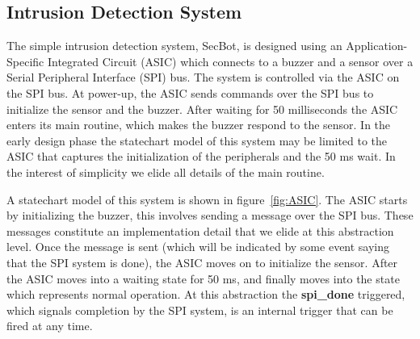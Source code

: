 

\subsection{Intrusion Detection System}
\label{sec:secbot}


The simple intrusion detection system, SecBot, is designed using an Application-Specific Integrated Circuit (ASIC) which connects to a buzzer and a sensor over a Serial Peripheral Interface (SPI) bus. The system is controlled via the ASIC on the SPI bus. At power-up, the ASIC sends commands over the SPI bus to initialize the sensor and the buzzer. After waiting for 50 milliseconds the ASIC enters its main routine, which makes the buzzer respond to the sensor. In the early design phase the statechart model of this system may be limited to the ASIC that captures the initialization of the peripherals and the 50 ms wait. In the interest of simplicity we elide all details of the main routine.

A statechart model of this system is shown in figure~\ref{fig:ASIC}. The ASIC starts by initializing the buzzer, this involves sending a message over the SPI bus. These messages constitute an implementation detail that we elide at this abstraction level. Once the message is sent (which will be indicated by some event saying that the SPI system is done), the ASIC moves on to initialize the sensor. After the ASIC moves into a waiting state for 50 ms, and finally moves into the state which represents normal operation. At this abstraction the \textbf{spi\_done} triggered, which signals completion by the SPI system, is an internal trigger that can be fired at any time.

